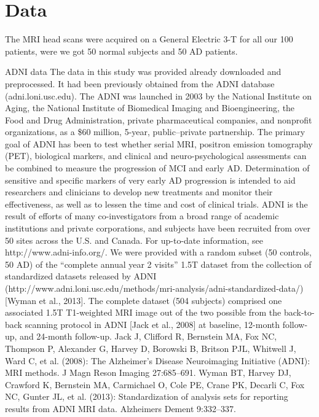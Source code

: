 \chapter{Data}

The MRI head scans were acquired on a General Electric 3-T for all our 100 patients, were we got 50 normal subjects and 50 AD patients.

ADNI data
The data in this study was provided already downloaded and preprocessed. It had been previously obtained from the ADNI database (adni.loni.usc.edu). The ADNI was launched in 2003 by the National Institute on Aging, the National Institute of Biomedical Imaging and Bioengineering, the Food and Drug Administration, private pharmaceutical companies, and nonprofit organizations, as a \$60 million, 5-year, public–private partnership. The primary goal of ADNI has been to test whether serial MRI, positron emission tomography (PET), biological markers, and clinical and neuro-psychological assessments can be combined to measure the progression of MCI and early AD. Determination of sensitive and specific markers of very early AD progression is intended to aid researchers and clinicians to develop new treatments and monitor their effectiveness, as well as to lessen the time and cost of clinical trials. ADNI is the result of efforts of many co-investigators from a broad range of academic institutions and private corporations, and subjects have been recruited from over 50 sites across the U.S. and Canada. For up-to-date information, see http://www.adni-info.org/.
We were provided with a random subset (50 controls, 50 AD) of the “complete annual year 2 visits” 1.5T dataset from the collection of standardized datasets released by ADNI (http://www.adni.loni.usc.edu/methods/mri-analysis/adni-standardized-data/) [Wyman et al., 2013]. The complete dataset (504 subjects) comprised one associated 1.5T T1-weighted MRI image out of the two possible from the back-to-back scanning protocol in ADNI [Jack et al., 2008] at baseline, 12-month follow-up, and 24-month follow-up.
Jack J, Clifford R, Bernstein MA, Fox NC, Thompson P, Alexander G, Harvey D, Borowski B, Britson PJL, Whitwell J, Ward C, et al. (2008): The Alzheimer’s Disease Neuroimaging Initiative (ADNI): MRI methods. J Magn Reson Imaging 27:685–691.
Wyman BT, Harvey DJ, Crawford K, Bernstein MA, Carmichael O, Cole PE, Crane PK, Decarli C, Fox NC, Gunter JL, et al. (2013): Standardization of analysis sets for reporting results from ADNI MRI data. Alzheimers Dement 9:332–337.

